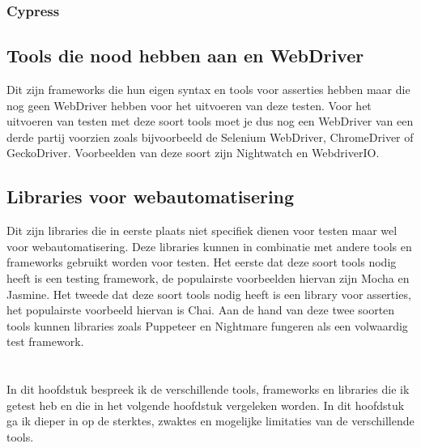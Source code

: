 \subsubsection{Cypress}

\subsection{Tools die nood hebben aan en WebDriver}

Dit zijn frameworks die hun eigen syntax en tools voor \glspl{assertie} hebben maar die nog geen \gls{WebDriver} hebben voor het uitvoeren van deze testen. Voor het uitvoeren van testen met deze soort tools moet je dus nog een WebDriver van een derde partij voorzien zoals bijvoorbeeld de Selenium WebDriver, ChromeDriver of GeckoDriver. Voorbeelden van deze soort zijn Nightwatch en WebdriverIO.

\subsection{Libraries voor webautomatisering}

Dit zijn libraries die in eerste plaats niet specifiek dienen voor testen maar wel voor webautomatisering. Deze libraries kunnen in combinatie met andere tools en frameworks gebruikt worden voor testen. Het eerste dat deze soort tools nodig heeft is een testing framework, de populairste voorbeelden hiervan zijn Mocha en Jasmine. Het tweede dat deze soort tools nodig heeft is een library voor asserties, het populairste voorbeeld hiervan is Chai. Aan de hand van deze twee soorten tools kunnen libraries zoals Puppeteer en Nightmare fungeren als een volwaardig test framework.
\section{}
In dit hoofdstuk bespreek ik de verschillende tools, frameworks en libraries die ik getest heb en die in het volgende hoofdstuk vergeleken worden. In dit hoofdstuk ga ik dieper in op de sterktes, zwaktes en mogelijke limitaties van de verschillende tools.



